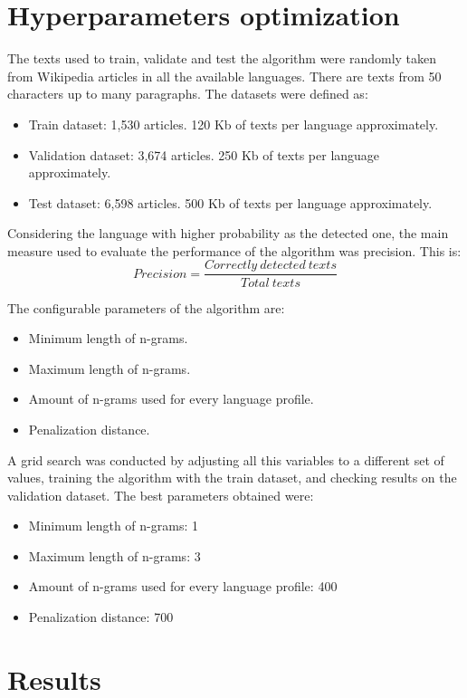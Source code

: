 \documentclass{llncs}
\begin{document}
\section{Hyperparameters optimization}
The texts used to train, validate and test the algorithm were randomly taken from Wikipedia articles in all the available languages. There are texts from 50 characters up to many paragraphs. The datasets were defined as: 
\begin{itemize}
	\item Train dataset: 1,530 articles. 120 Kb of texts per language approximately.
	\item Validation dataset: 3,674 articles. 250 Kb of texts per language approximately.
	\item Test dataset: 6,598 articles. 500 Kb of texts per language approximately.
\end{itemize}

Considering the language with higher probability as the detected one, the main measure used to evaluate the performance of the algorithm was precision. This is:
\begin{equation}
Precision = \frac{Correctly\:detected\:texts}
{Total\:texts}
\end{equation}

The configurable parameters of the algorithm are:
\begin{itemize}
	\item Minimum length of n-grams.
	\item Maximum length of n-grams.
	\item Amount of n-grams used for every language profile.
	\item Penalization distance.
\end{itemize}

A grid search was conducted by adjusting all this variables to a different set of values, training the algorithm with the train dataset, and checking results on the validation dataset. The best parameters obtained were:
\begin{itemize}
	\item Minimum length of n-grams: 1
	\item Maximum length of n-grams: 3
	\item Amount of n-grams used for every language profile: 400
	\item Penalization distance: 700
\end{itemize}



\section{Results}
\end{document}
